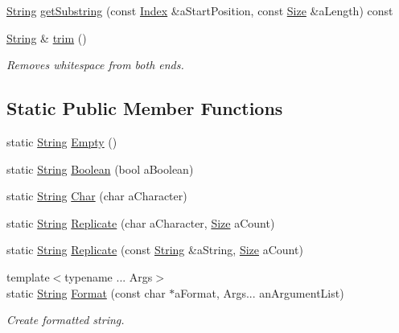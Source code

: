 \begin{DoxyCompactItemize}
\item 
\hyperlink{classlibrary_1_1core_1_1types_1_1_string}{String} \hyperlink{classlibrary_1_1core_1_1types_1_1_string_aaf9377048b900766d05a1af9182cf251}{get\+Substring} (const \hyperlink{namespacelibrary_1_1core_1_1types_ad87eeb821d7067ec94e06ed1980d6350}{Index} \&a\+Start\+Position, const \hyperlink{namespacelibrary_1_1core_1_1types_a701626ea1027888ebbb8cfd0ff7adab0}{Size} \&a\+Length) const
\item 
\hyperlink{classlibrary_1_1core_1_1types_1_1_string}{String} \& \hyperlink{classlibrary_1_1core_1_1types_1_1_string_a42426ffb11bb0b2789ba0991064a01b5}{trim} ()
\begin{DoxyCompactList}\small\item\em Removes whitespace from both ends. \end{DoxyCompactList}\end{DoxyCompactItemize}
\subsection*{Static Public Member Functions}
\begin{DoxyCompactItemize}
\item 
static \hyperlink{classlibrary_1_1core_1_1types_1_1_string}{String} \hyperlink{classlibrary_1_1core_1_1types_1_1_string_a4d359cb0dba46e14ca46f90e728c2b96}{Empty} ()
\item 
static \hyperlink{classlibrary_1_1core_1_1types_1_1_string}{String} \hyperlink{classlibrary_1_1core_1_1types_1_1_string_afd43951e5c53b89428dc36db99a83842}{Boolean} (bool a\+Boolean)
\item 
static \hyperlink{classlibrary_1_1core_1_1types_1_1_string}{String} \hyperlink{classlibrary_1_1core_1_1types_1_1_string_abbc5a795da1a72d1456ba4950e62602c}{Char} (char a\+Character)
\item 
static \hyperlink{classlibrary_1_1core_1_1types_1_1_string}{String} \hyperlink{classlibrary_1_1core_1_1types_1_1_string_ab476d0986c7d364261ee3e668890836c}{Replicate} (char a\+Character, \hyperlink{namespacelibrary_1_1core_1_1types_a701626ea1027888ebbb8cfd0ff7adab0}{Size} a\+Count)
\item 
static \hyperlink{classlibrary_1_1core_1_1types_1_1_string}{String} \hyperlink{classlibrary_1_1core_1_1types_1_1_string_a85504c430c0fdc58393f819205fedd49}{Replicate} (const \hyperlink{classlibrary_1_1core_1_1types_1_1_string}{String} \&a\+String, \hyperlink{namespacelibrary_1_1core_1_1types_a701626ea1027888ebbb8cfd0ff7adab0}{Size} a\+Count)
\item 
{\footnotesize template$<$typename ... Args$>$ }\\static \hyperlink{classlibrary_1_1core_1_1types_1_1_string}{String} \hyperlink{classlibrary_1_1core_1_1types_1_1_string_ae1745f54be6952d7b5a388239377b287}{Format} (const char $\ast$a\+Format, Args... an\+Argument\+List)
\begin{DoxyCompactList}\small\item\em Create formatted string. \end{DoxyCompactList}\end{DoxyCompactItemize}


